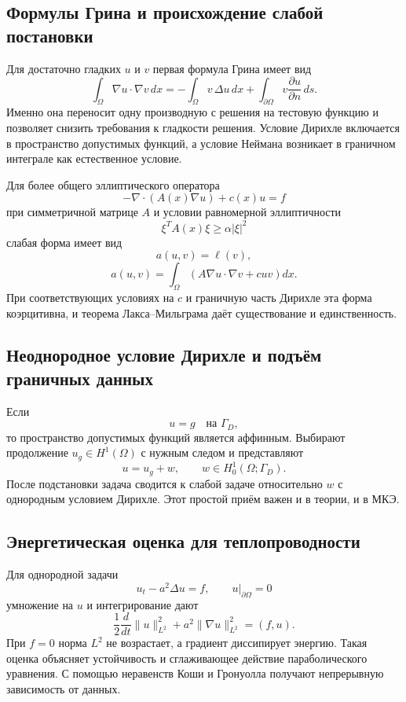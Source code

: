 \subsection{Формулы Грина и происхождение слабой постановки}

Для достаточно гладких $u$ и $v$ первая формула Грина имеет вид
\[
    \int_\Omega \nabla u\cdot\nabla v\,dx
    =-\int_\Omega v\,\Delta u\,dx
     +\int_{\partial\Omega}v\frac{\partial u}{\partial n}\,ds.
\]
Именно она переносит одну производную с решения на тестовую функцию и позволяет
снизить требования к гладкости решения. Условие Дирихле включается в пространство
допустимых функций, а условие Неймана возникает в граничном интеграле как
естественное условие.

Для более общего эллиптического оператора
\[
    -\nabla\cdot(A(x)\nabla u)+c(x)u=f
\]
при симметричной матрице $A$ и условии равномерной эллиптичности
\[
    \xi^T A(x)\xi\ge \alpha|\xi|^2
\]
слабая форма имеет вид
\[
    a(u,v)=\ell(v),
\]
\[
    a(u,v)=\int_\Omega
    \left(A\nabla u\cdot\nabla v+cuv\right)dx.
\]
При соответствующих условиях на $c$ и граничную часть Дирихле эта форма
коэрцитивна, и теорема Лакса--Мильграма даёт существование и единственность.

\subsection{Неоднородное условие Дирихле и подъём граничных данных}

Если
\[
    u=g\quad\text{на }\Gamma_D,
\]
то пространство допустимых функций является аффинным. Выбирают продолжение
$u_g\in H^1(\Omega)$ с нужным следом и представляют
\[
    u=u_g+w,
    \qquad w\in H^1_0(\Omega;\Gamma_D).
\]
После подстановки задача сводится к слабой задаче относительно $w$ с однородным
условием Дирихле. Этот простой приём важен и в теории, и в МКЭ.

\subsection{Энергетическая оценка для теплопроводности}

Для однородной задачи
\[
    u_t-a^2\Delta u=f,
    \qquad u|_{\partial\Omega}=0
\]
умножение на $u$ и интегрирование дают
\[
    \frac12\frac{d}{dt}\|u\|_{L^2}^2
    +a^2\|\nabla u\|_{L^2}^2
    =(f,u).
\]
При $f=0$ норма $L^2$ не возрастает, а градиент диссипирует энергию. Такая
оценка объясняет устойчивость и сглаживающее действие параболического уравнения.
С помощью неравенств Коши и Гронуолла получают непрерывную зависимость от данных.

